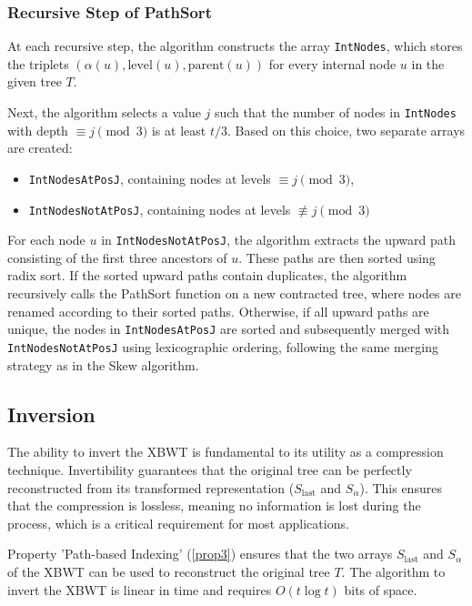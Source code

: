 \subsubsection{Recursive Step of PathSort}
At each recursive step, the algorithm constructs the array \texttt{IntNodes}, which stores the triplets $(\alpha(u), \text{level}(u), \text{parent}(u))$ for every internal node $u$ in the given tree $T$.  

Next, the algorithm selects a value $j$ such that the number of nodes in \texttt{IntNodes} with depth $\equiv j \pmod{3}$ is at least $t/3$. Based on this choice, two separate arrays are created:  
\begin{itemize}
    \item \texttt{IntNodesAtPosJ}, containing nodes at levels $\equiv j \pmod{3}$,
    \item \texttt{IntNodesNotAtPosJ}, containing nodes at levels $\not\equiv j \pmod{3}$
\end{itemize}

For each node $u$ in \texttt{IntNodesNotAtPosJ}, the algorithm extracts the upward path consisting of the first three ancestors of $u$. These paths are then sorted using radix sort. If the sorted upward paths contain duplicates, the algorithm recursively calls the PathSort function on a new contracted tree, where nodes are renamed according to their sorted paths. Otherwise, if all upward paths are unique, the nodes in \texttt{IntNodesAtPosJ} are sorted and subsequently merged with \texttt{IntNodesNotAtPosJ} using lexicographic ordering, following the same merging strategy as in the Skew algorithm.

\subsection{Inversion}
The ability to invert the XBWT is fundamental to its utility as a compression technique. Invertibility guarantees that the original tree can be perfectly reconstructed from its transformed representation ($S_{\text{last}}$ and $S_{\alpha}$). This ensures that the compression is lossless, meaning no information is lost during the process, which is a critical requirement for most applications.

Property 'Path-based Indexing' (\cref{prop3}) ensures that the two arrays $S_{\text{last}}$ and $S_{\alpha}$ of the XBWT can be used to reconstruct the original tree $T$. The algorithm to invert the XBWT is linear in time and requires $O(t \log t)$ bits of space.

